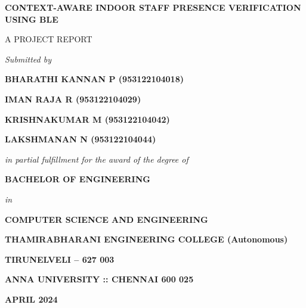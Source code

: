 \begin{titlepage}
    \begin{center}
        {\fontsize{18}{22}\selectfont \textbf{CONTEXT-AWARE INDOOR STAFF PRESENCE VERIFICATION USING BLE} \par}
        
        \vspace{1.5cm}
        {\fontsize{14}{17}\selectfont A PROJECT REPORT \par}
        
        \vspace{1cm}
        {\fontsize{14}{17}\selectfont \textit{Submitted by} \par}
        
        \vspace{1cm}
        {\fontsize{16}{20}\selectfont \textbf{BHARATHI KANNAN P (953122104018)} \par}
        {\fontsize{16}{20}\selectfont \textbf{IMAN RAJA R (953122104029)} \par}
        {\fontsize{16}{20}\selectfont \textbf{KRISHNAKUMAR M (953122104042)} \par}
        {\fontsize{16}{20}\selectfont \textbf{LAKSHMANAN N (953122104044)} \par}
        
        \vfill
        {\fontsize{14}{17}\selectfont \textit{in partial fulfillment for the award of the degree of} \par}
        
        \vspace{0.8cm}
        {\fontsize{16}{20}\selectfont \textbf{BACHELOR OF ENGINEERING} \par}
        {\fontsize{14}{17}\selectfont \textit{in} \par}
        {\fontsize{16}{20}\selectfont \textbf{COMPUTER SCIENCE AND ENGINEERING} \par}
        
        \vspace{1cm}
        {\fontsize{14}{17}\selectfont \textbf{THAMIRABHARANI ENGINEERING COLLEGE (Autonomous)} \par}
        {\fontsize{16}{20}\selectfont \textbf{TIRUNELVELI – 627 003} \par}
        
        \vspace{0.5cm}
        {\fontsize{16}{20}\selectfont \textbf{ANNA UNIVERSITY :: CHENNAI 600 025} \par}
        
        \vspace{0.5cm}
        {\fontsize{14}{17}\selectfont \textbf{APRIL 2024} \par}
    \end{center}
\end{titlepage}
